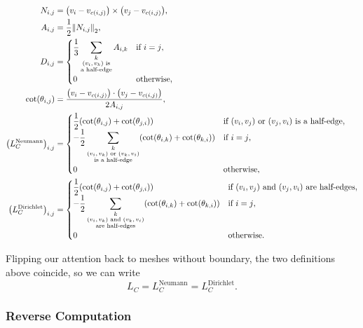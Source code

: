 \begin{align*}
	N_{i, j} &= \pof{v_i - v_{c\pof{i, j}}} \times \pof{v_j - v_{c\pof{i, j}}}, \\
	A_{i, j} &= \frac{1}{2}\norm{N_{i, j}}_2, \\
	D_{i, j} &= \begin{cases}
		\displaystyle\frac{1}{3}\sum_{\substack{k \\ \text{\(\pof{v_i, v_k}\) is} \\ \text{a half-edge}}}A_{i, k} & \text{if \(i = j\)}, \\
		0 & \text{otherwise},
	\end{cases} \\
	\cot\pof{\theta_{i, j}} &= \frac{\pof{v_i - v_{c\pof{i, j}}} \cdot \pof{v_j - v_{c\pof{i, j}}}}{2A_{i, j}}, \\
	\pof{L_C^{\text{Neumann}}}_{i, j} &= \begin{cases}
		\displaystyle\frac{1}{2}\pof{\cot\pof{\theta_{i, j}} + \cot\pof{\theta_{j, i}}} & \text{if \(\pof{v_i, v_j}\) or \(\pof{v_j, v_i}\) is a half-edge}, \\
		\displaystyle-\frac{1}{2}\sum_{\substack{k \\ \text{\(\pof{v_i, v_k}\) or \(\pof{v_k, v_i}\)} \\ \text{is a half-edge}}}\pof{\cot\pof{\theta_{i, k}} + \cot\pof{\theta_{k, i}}} & \text{if \(i = j\)}, \\
		0 & \text{otherwise},
	\end{cases} \\
	\pof{L_C^{\text{Dirichlet}}}_{i, j} &= \begin{cases}
		\displaystyle\frac{1}{2}\pof{\cot\pof{\theta_{i, j}} + \cot\pof{\theta_{j, i}}} & \text{if \(\pof{v_i, v_j}\) and \(\pof{v_j, v_i}\) are half-edges}, \\
		\displaystyle-\frac{1}{2}\sum_{\substack{k \\ \text{\(\pof{v_i, v_k}\) and \(\pof{v_k, v_i}\)} \\ \text{are half-edges}}}\pof{\cot\pof{\theta_{i, k}} + \cot\pof{\theta_{k, i}}} & \text{if \(i = j\)}, \\
		0 & \text{otherwise}.
	\end{cases}
\end{align*}

Flipping our attention back to meshes without boundary, the two definitions above coincide, so we can write \[L_C = L_C^{\text{Neumann}} = L_C^{\text{Dirichlet}}.\]

\subsubsection{Reverse Computation}

